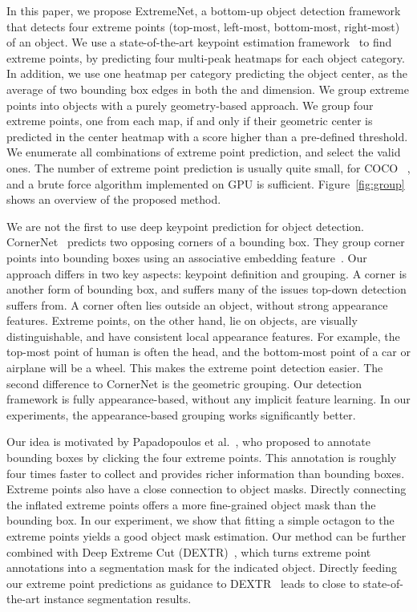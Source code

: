 \documentclass[10pt,twocolumn,letterpaper]{article}
\begin{document}
In this paper, we propose ExtremeNet, a bottom-up object detection framework that detects four extreme points (top-most, left-most, bottom-most, right-most) of an object. 
We use a state-of-the-art keypoint estimation framework~\cite{newell2016stacked,Chen_2018_CVPR,xiao2018simple,newell2017associative,cao2017realtime} to find extreme points, by predicting four multi-peak heatmaps for each object category.
In addition, we use one heatmap per category predicting the object center, as the average of two bounding box edges in both the  and  dimension.
We group extreme points into objects with a purely geometry-based approach.
We group four extreme points, one from each map, if and only if their geometric center is predicted in the center heatmap with a score higher than a pre-defined threshold.
We enumerate all  combinations of extreme point prediction, and select the valid ones.
The number of extreme point prediction  is usually quite small, for COCO~\cite{lin2014microsoft} , and a brute force algorithm implemented on GPU is sufficient.
Figure~\ref{fig:group} shows an overview of the proposed method.


We are not the first to use deep keypoint prediction for object detection.
CornerNet~\cite{Law_2018_ECCV} predicts two opposing corners of a bounding box.
They group corner points into bounding boxes using an associative embedding feature~\cite{newell2017associative}. 
Our approach differs in two key aspects: keypoint definition and grouping. 
A corner is another form of bounding box, and suffers many of the issues top-down detection suffers from.
A corner often lies outside an object, without strong appearance features.
Extreme points, on the other hand, lie on objects, are visually distinguishable, and have consistent local appearance features.
For example, the top-most point of human is often the head, and the bottom-most point of a car or airplane will be a wheel.
This makes the extreme point detection easier.
The second difference to CornerNet is the geometric grouping.
Our detection framework is fully appearance-based, without any implicit feature learning.
In our experiments, the appearance-based grouping works significantly better.

Our idea is motivated by Papadopoulos et al.~\cite{papadopoulos2017extreme}, who proposed to annotate bounding boxes by clicking the four extreme points.
This annotation is roughly four times faster to collect and provides richer information than bounding boxes.
Extreme points also have a close connection to object masks.
Directly connecting the inflated extreme points offers a more fine-grained object mask than the bounding box. 
In our experiment, we show that fitting a simple octagon to the extreme points yields a good object mask estimation.
Our method can be further combined with Deep Extreme Cut (DEXTR)~\cite{Man+18}, which turns extreme point annotations into a segmentation mask for the indicated object.
Directly feeding our extreme point predictions as guidance to DEXTR~\cite{Man+18} leads to close to state-of-the-art instance segmentation results.
\end{document}
